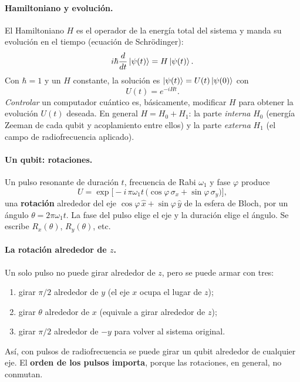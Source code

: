 \paragraph{Hamiltoniano y evolución.} El Hamiltoniano $H$ es el operador de la
energía total del sistema y manda su evolución en el tiempo (ecuación de
Schrödinger):
\begin{equation}
  i\hbar\frac{d}{dt}\left|\psi(t)\right\rangle=H\left|\psi(t)\right\rangle .
\end{equation}
Con $\hbar=1$ y un $H$ constante, la solución es $\left|\psi(t)\right\rangle=U(t)\left|\psi(0)\right\rangle$
con
\begin{equation}
  U(t)=e^{-iHt} .
\end{equation}
\emph{Controlar} un computador cuántico es, básicamente, modificar $H$ para
obtener la evolución $U(t)$ deseada. En general $H=H_0+H_1$: la parte
\emph{interna} $H_0$ (energía Zeeman de cada qubit y acoplamiento entre ellos)
y la parte \emph{externa} $H_1$ (el campo de radiofrecuencia aplicado).

\paragraph{Un qubit: rotaciones.} Un pulso resonante de duración $t$, frecuencia
de Rabi $\omega_1$ y fase $\varphi$ produce
\begin{equation}
  U=\exp\!\Big[-i\,\pi\omega_1t\,\big(\cos\varphi\,\sigma_x+\sin\varphi\,\sigma_y\big)\Big],
\end{equation}
una \textbf{rotación} alrededor del eje $\cos\varphi\,\hat x+\sin\varphi\,\hat y$ de
la esfera de Bloch, por un ángulo $\theta=2\pi\omega_1t$. La fase del pulso
elige el eje y la duración elige el ángulo. Se escribe $R_x(\theta)$,
$R_y(\theta)$, etc.

\paragraph{La rotación alrededor de $z$.} Un solo pulso no puede girar
alrededor de $z$, pero se puede armar con tres:
\begin{enumerate}
  \item girar $\pi/2$ alrededor de $y$ (el eje $x$ ocupa el lugar de $z$);
  \item girar $\theta$ alrededor de $x$ (equivale a girar alrededor de $z$);
  \item girar $\pi/2$ alrededor de $-y$ para volver al sistema original.
\end{enumerate}
Así, con pulsos de radiofrecuencia se puede girar un qubit alrededor de
cualquier eje. El \textbf{orden de los pulsos importa}, porque las
rotaciones, en general, no conmutan.

